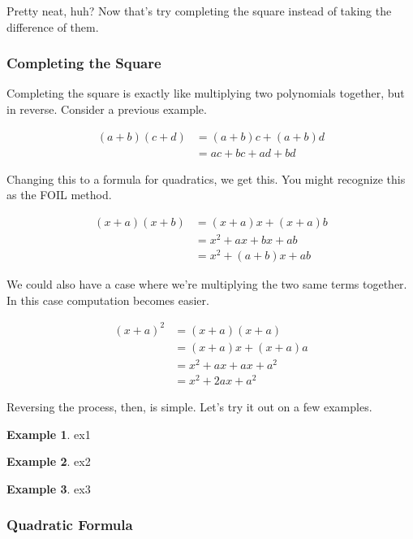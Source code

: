 \documentclass{scrbook}
\theoremstyle{definition}
\newtheorem{example}{Example}
\begin{document}
Pretty neat, huh? Now that's try completing the square instead of taking the difference of them.

\subsubsection{Completing the Square}

Completing the square is exactly like multiplying two polynomials together, but in reverse. Consider a previous example.

\begin{align*}
  (a + b)(c + d) &= (a + b)c + (a + b)d\\
  &= ac + bc + ad + bd
\end{align*}

Changing this to a formula for quadratics, we get this. You might recognize this as the FOIL method.

\begin{align*}
  (x + a)(x + b) &= (x + a)x + (x + a)b\\
  &= x^2 + ax + bx + ab\\
  &= x^2 + (a + b)x + ab
\end{align*}

We could also have a case where we're multiplying the two same terms together. In this case computation becomes easier.

\begin{align*}
  (x + a)^2 &= (x + a)(x + a) \\ 
  &= (x + a)x + (x + a)a\\
  &= x^2 + ax + ax + a^2\\
  &= x^2 + 2ax + a^2
\end{align*}

Reversing the process, then, is simple. Let's try it out on a few examples.

\begin{example}
  ex1
\end{example}

\begin{example}
  ex2
\end{example}

\begin{example}
  ex3
\end{example}

\subsubsection{Quadratic Formula}
\end{document}
